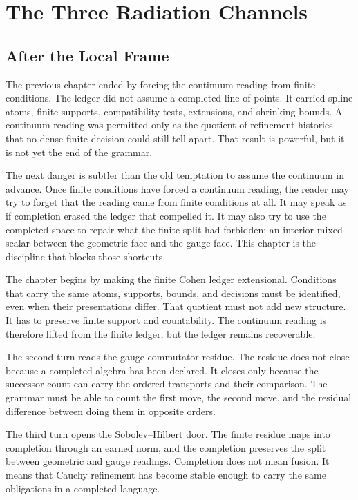 \chapter{The Three Radiation Channels}
\label{chap:continuum-boundary-radiation}

\section{After the Local Frame}

The previous chapter ended by forcing the continuum reading from finite
conditions. The ledger did not assume a completed line of points. It carried
spline atoms, finite supports, compatibility tests, extensions, and shrinking
bounds. A continuum reading was permitted only as the quotient of refinement
histories that no dense finite decision could still tell apart. That result is
powerful, but it is not yet the end of the grammar.

The next danger is subtler than the old temptation to assume the continuum in
advance. Once finite conditions have forced a continuum reading, the reader may
try to forget that the reading came from finite conditions at all. It may speak
as if completion erased the ledger that compelled it. It may also try to use
the completed space to repair what the finite split had forbidden: an interior
mixed scalar between the geometric face and the gauge face. This chapter is the
discipline that blocks those shortcuts.

The chapter begins by making the finite Cohen ledger extensional. Conditions
that carry the same atoms, supports, bounds, and decisions must be identified,
even when their presentations differ. That quotient must not add new
structure. It has to preserve finite support and countability. The continuum
reading is therefore lifted from the finite ledger, but the ledger remains
recoverable.

The second turn reads the gauge commutator residue. The residue does not close
because a completed algebra has been declared. It closes only because the
successor count can carry the ordered transports and their comparison. The
grammar must be able to count the first move, the second move, and the
residual difference between doing them in opposite orders.

The third turn opens the Sobolev--Hilbert door. The finite residue maps into
completion through an earned norm, and the completion preserves the split
between geometric and gauge readings. Completion does not mean fusion. It
means that Cauchy refinement has become stable enough to carry the same
obligations in a completed language.

